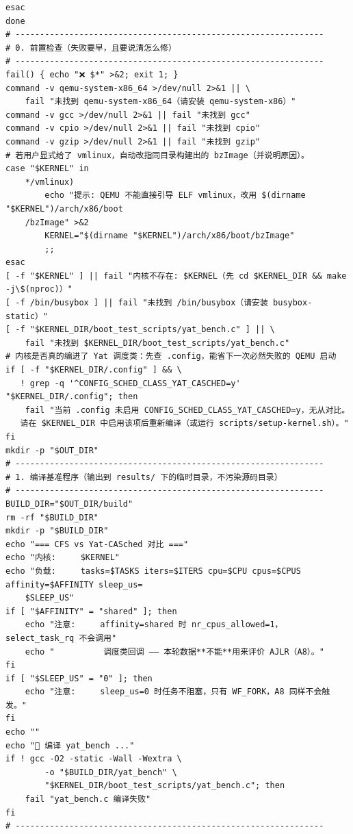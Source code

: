 \documentclass[10pt,a4paper]{article}
\newenvironment{yatpage}{\vspace*{0pt}}{\par}
\begin{document}
\begin{yatpage}
\begin{Verbatim}[fontsize=\fontsize{8.2}{9.8}\selectfont]
    esac
done
# ---------------------------------------------------------------
# 0. 前置检查（失败要早，且要说清怎么修）
# ---------------------------------------------------------------
fail() { echo "❌ $*" >&2; exit 1; }
command -v qemu-system-x86_64 >/dev/null 2>&1 || \
    fail "未找到 qemu-system-x86_64（请安装 qemu-system-x86）"
command -v gcc >/dev/null 2>&1 || fail "未找到 gcc"
command -v cpio >/dev/null 2>&1 || fail "未找到 cpio"
command -v gzip >/dev/null 2>&1 || fail "未找到 gzip"
# 若用户显式给了 vmlinux，自动改指同目录构建出的 bzImage（并说明原因）。
case "$KERNEL" in
    */vmlinux)
        echo "提示: QEMU 不能直接引导 ELF vmlinux，改用 $(dirname "$KERNEL")/arch/x86/boot
    /bzImage" >&2
        KERNEL="$(dirname "$KERNEL")/arch/x86/boot/bzImage"
        ;;
esac
[ -f "$KERNEL" ] || fail "内核不存在: $KERNEL（先 cd $KERNEL_DIR && make -j\$(nproc)）"
[ -f /bin/busybox ] || fail "未找到 /bin/busybox（请安装 busybox-static）"
[ -f "$KERNEL_DIR/boot_test_scripts/yat_bench.c" ] || \
    fail "未找到 $KERNEL_DIR/boot_test_scripts/yat_bench.c"
# 内核是否真的编进了 Yat 调度类：先查 .config，能省下一次必然失败的 QEMU 启动
if [ -f "$KERNEL_DIR/.config" ] && \
   ! grep -q '^CONFIG_SCHED_CLASS_YAT_CASCHED=y' "$KERNEL_DIR/.config"; then
    fail "当前 .config 未启用 CONFIG_SCHED_CLASS_YAT_CASCHED=y，无从对比。
   请在 $KERNEL_DIR 中启用该项后重新编译（或运行 scripts/setup-kernel.sh）。"
fi
mkdir -p "$OUT_DIR"
# ---------------------------------------------------------------
# 1. 编译基准程序（输出到 results/ 下的临时目录，不污染源码目录）
# ---------------------------------------------------------------
BUILD_DIR="$OUT_DIR/build"
rm -rf "$BUILD_DIR"
mkdir -p "$BUILD_DIR"
echo "=== CFS vs Yat-CASched 对比 ==="
echo "内核:     $KERNEL"
echo "负载:     tasks=$TASKS iters=$ITERS cpu=$CPU cpus=$CPUS affinity=$AFFINITY sleep_us=
    $SLEEP_US"
if [ "$AFFINITY" = "shared" ]; then
    echo "注意:     affinity=shared 时 nr_cpus_allowed=1，select_task_rq 不会调用"
    echo "          调度类回调 —— 本轮数据**不能**用来评价 AJLR（A8）。"
fi
if [ "$SLEEP_US" = "0" ]; then
    echo "注意:     sleep_us=0 时任务不阻塞，只有 WF_FORK，A8 同样不会触发。"
fi
echo ""
echo "🔧 编译 yat_bench ..."
if ! gcc -O2 -static -Wall -Wextra \
        -o "$BUILD_DIR/yat_bench" \
        "$KERNEL_DIR/boot_test_scripts/yat_bench.c"; then
    fail "yat_bench.c 编译失败"
fi
# ---------------------------------------------------------------
\end{Verbatim}
\end{yatpage}
\end{document}
